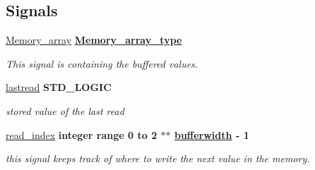\subsection*{Signals}
 \begin{DoxyCompactItemize}
\item 
\hypertarget{classDAC__buffer_1_1Buffer__dac_aa3242fe5cbe81a6710bd0ed34005d4ef}{\hyperlink{classDAC__buffer_1_1Buffer__dac_aa3242fe5cbe81a6710bd0ed34005d4ef}{Memory\-\_\-array} {\bfseries {\bfseries \hyperlink{classDAC__buffer_1_1Buffer__dac_a658e2166090ca64ce974029de2840027}{Memory\-\_\-array\-\_\-type}} \textcolor{vhdlchar}{ }} }\label{classDAC__buffer_1_1Buffer__dac_aa3242fe5cbe81a6710bd0ed34005d4ef}

\begin{DoxyCompactList}\small\item\em This signal is containing the buffered values. \end{DoxyCompactList}\item 
\hypertarget{classDAC__buffer_1_1Buffer__dac_a112659537d3ba8eb606d42ca2df463ba}{\hyperlink{classDAC__buffer_1_1Buffer__dac_a112659537d3ba8eb606d42ca2df463ba}{lastread} {\bfseries \textcolor{comment}{S\-T\-D\-\_\-\-L\-O\-G\-I\-C}\textcolor{vhdlchar}{ }} }\label{classDAC__buffer_1_1Buffer__dac_a112659537d3ba8eb606d42ca2df463ba}

\begin{DoxyCompactList}\small\item\em stored value of the last read \end{DoxyCompactList}\item 
\hypertarget{classDAC__buffer_1_1Buffer__dac_a902704851875fe125eaa6f1b125dfd0f}{\hyperlink{classDAC__buffer_1_1Buffer__dac_a902704851875fe125eaa6f1b125dfd0f}{read\-\_\-index} {\bfseries \textcolor{comment}{integer}\textcolor{vhdlchar}{ }\textcolor{vhdlkeyword}{range}\textcolor{vhdlchar}{ } \textcolor{vhdldigit}{0} \textcolor{vhdlchar}{ }\textcolor{vhdlchar}{ }\textcolor{vhdlchar}{ }\textcolor{vhdlkeyword}{to}\textcolor{vhdlchar}{ }\textcolor{vhdlchar}{ }\textcolor{vhdlchar}{ } \textcolor{vhdldigit}{2} \textcolor{vhdlchar}{ }\textcolor{vhdlchar}{$\ast$}\textcolor{vhdlchar}{$\ast$}\textcolor{vhdlchar}{ }{\bfseries \hyperlink{classDAC__buffer_a2f94b7b31a8914ee23be5e000f89e921}{bufferwidth}} \textcolor{vhdlchar}{ }\textcolor{vhdlchar}{-\/}\textcolor{vhdlchar}{ } \textcolor{vhdldigit}{1} \textcolor{vhdlchar}{ }} }\label{classDAC__buffer_1_1Buffer__dac_a902704851875fe125eaa6f1b125dfd0f}

\begin{DoxyCompactList}\small\item\em this signal keeps track of where to write the next value in the memory. \end{DoxyCompactList}\end{DoxyCompactItemize}


